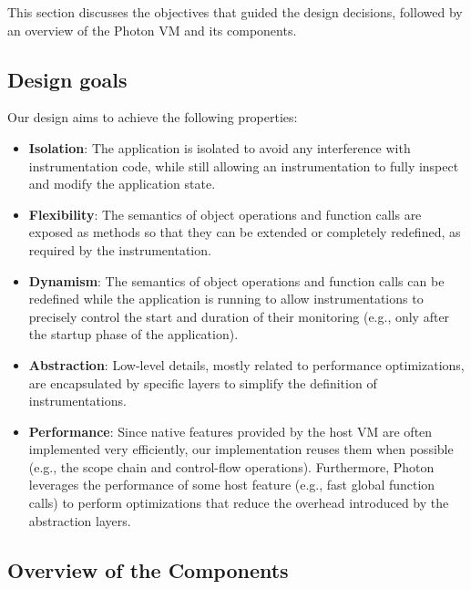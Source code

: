 This section discusses the objectives that guided the design decisions,
followed by an overview of the Photon VM and its components.

\subsection{Design goals}

Our design aims to achieve the following properties:
\begin{itemize}
    \item \textbf{Isolation}: The application is isolated to avoid any
        interference with instrumentation code, while still allowing an
        instrumentation to fully inspect and modify the application state.
    \item \textbf{Flexibility}: The semantics of object operations and function
        calls are exposed as methods so that they can be extended or
        completely redefined, as required by the instrumentation.
    \item \textbf{Dynamism}: The semantics of object operations and function
        calls can be redefined while the application is running to allow
        instrumentations to precisely control the start and duration
        of their monitoring (e.g., only after the startup phase of the application).
    \item \textbf{Abstraction}: Low-level details, mostly related to
        performance optimizations, are encapsulated by specific layers to
        simplify the definition of instrumentations.
    \item \textbf{Performance}:
        Since native features provided by the host VM are often implemented
        very efficiently, our implementation reuses them when possible (e.g.,
        the scope chain and control-flow operations). Furthermore, Photon
        leverages the performance of some host feature (e.g., fast global
        function calls) to perform optimizations that reduce the overhead
        introduced by the abstraction layers.
\end{itemize}

\subsection{Overview of the Components}

